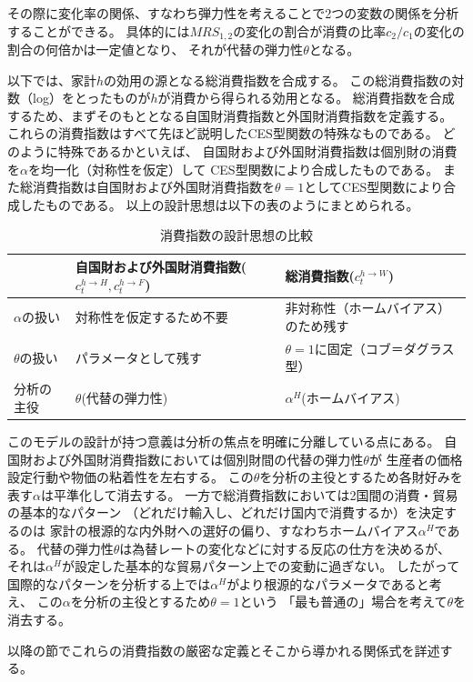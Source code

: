 その際に変化率の関係、すなわち弾力性を考えることで2つの変数の関係を分析することができる。
具体的には\(MRS_{1,2}\)の変化の割合が消費の比率\(c_2/c_1\)の変化の割合の何倍かは一定値となり、
それが代替の弾力性\(\theta\)となる。

以下では、家計\(h\)の効用の源となる総消費指数を合成する。
この総消費指数の対数（log）をとったものが\(h\)が消費から得られる効用となる。
総消費指数を合成するため、まずそのもととなる自国財消費指数と外国財消費指数を定義する。
これらの消費指数はすべて先ほど説明したCES型関数の特殊なものである。
どのように特殊であるかといえば、
自国財および外国財消費指数は個別財の消費を\(\alpha\)を均一化（対称性を仮定）して
CES型関数により合成したものである。
また総消費指数は自国財および外国財消費指数を\(\theta=1\)としてCES型関数により合成したものである。
以上の設計思想は以下の表のようにまとめられる。

\begin{table}[H]
    \centering
    \caption{消費指数の設計思想の比較}
    \label{tab:chapter3_households_indices_philosophy}
    \begin{tabular}{lll}
        \toprule
        & 自国財および外国財消費指数(\(c_t^{h\to H},c_t^{h\to F}\)) & 総消費指数(\(c_t^{h\to W}\)) \\
        \midrule
        \(\alpha\)の扱い & 対称性を仮定するため不要 & 非対称性（ホームバイアス）のため残す \\
        \(\theta\)の扱い & パラメータとして残す & \(\theta=1\)に固定（コブ＝ダグラス型） \\
        分析の主役 & \(\theta\)(代替の弾力性) & \(\alpha^H\)(ホームバイアス) \\
        \bottomrule
    \end{tabular}
\end{table}

このモデルの設計が持つ意義は分析の焦点を明確に分離している点にある。
自国財および外国財消費指数においては個別財間の代替の弾力性\(\theta\)が
生産者の価格設定行動や物価の粘着性を左右する。
この\(\theta\)を分析の主役とするため各財好みを表す\(\alpha\)は平準化して消去する。
一方で総消費指数においては2国間の消費・貿易の基本的なパターン
（どれだけ輸入し、どれだけ国内で消費するか）を決定するのは
家計の根源的な内外財への選好の偏り、すなわちホームバイアス\(\alpha^H\)である。
代替の弾力性\(\theta\)は為替レートの変化などに対する反応の仕方を決めるが、
それは\(\alpha^H\)が設定した基本的な貿易パターン上での変動に過ぎない。
したがって国際的なパターンを分析する上では\(\alpha^H\)がより根源的なパラメータであると考え、
この\(\alpha\)を分析の主役とするため\(\theta=1\)という
「最も普通の」場合を考えて\(\theta\)を消去する。

以降の節でこれらの消費指数の厳密な定義とそこから導かれる関係式を詳述する。